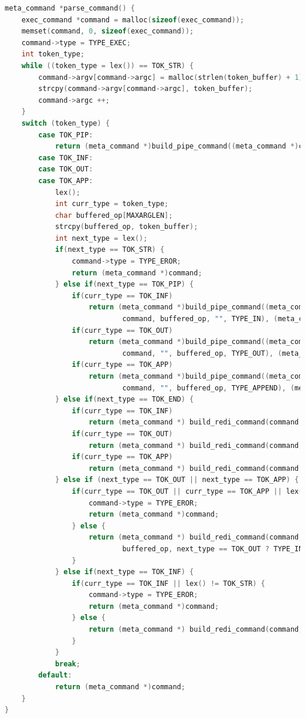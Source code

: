 \documentclass[blue,normal,cn]{elegantnote}
\begin{document}
\begin{lstlisting}[language=C]
meta_command *parse_command() {
    exec_command *command = malloc(sizeof(exec_command));
    memset(command, 0, sizeof(exec_command));
    command->type = TYPE_EXEC;
    int token_type;
    while ((token_type = lex()) == TOK_STR) {
        command->argv[command->argc] = malloc(strlen(token_buffer) + 1);
        strcpy(command->argv[command->argc], token_buffer);
        command->argc ++;
    }
    switch (token_type) {
        case TOK_PIP:
            return (meta_command *)build_pipe_command((meta_command *)command,  (meta_command *)parse_command());
        case TOK_INF:
        case TOK_OUT:
        case TOK_APP:
            lex();
            int curr_type = token_type;
            char buffered_op[MAXARGLEN];
            strcpy(buffered_op, token_buffer);
            int next_type = lex();
            if(next_type == TOK_STR) {
                command->type = TYPE_EROR;
                return (meta_command *)command;
            } else if(next_type == TOK_PIP) {
                if(curr_type == TOK_INF)
                    return (meta_command *)build_pipe_command((meta_command *) build_redi_command(
                            command, buffered_op, "", TYPE_IN), (meta_command *)parse_command());
                if(curr_type == TOK_OUT)
                    return (meta_command *)build_pipe_command((meta_command *) build_redi_command(
                            command, "", buffered_op, TYPE_OUT), (meta_command *)parse_command());
                if(curr_type == TOK_APP)
                    return (meta_command *)build_pipe_command((meta_command *) build_redi_command(
                            command, "", buffered_op, TYPE_APPEND), (meta_command *)parse_command());
            } else if(next_type == TOK_END) {
                if(curr_type == TOK_INF)
                    return (meta_command *) build_redi_command(command, buffered_op, "", TYPE_IN);
                if(curr_type == TOK_OUT)
                    return (meta_command *) build_redi_command(command, "", buffered_op, TYPE_OUT);
                if(curr_type == TOK_APP)
                    return (meta_command *) build_redi_command(command, "", buffered_op, TYPE_APPEND);
            } else if (next_type == TOK_OUT || next_type == TOK_APP) {
                if(curr_type == TOK_OUT || curr_type == TOK_APP || lex() != TOK_STR) {
                    command->type = TYPE_EROR;
                    return (meta_command *)command;
                } else {
                    return (meta_command *) build_redi_command(command, token_buffer,
                            buffered_op, next_type == TOK_OUT ? TYPE_INOUT : TYPE_INAPPEND);
                }
            } else if(next_type == TOK_INF) {
                if(curr_type == TOK_INF || lex() != TOK_STR) {
                    command->type = TYPE_EROR;
                    return (meta_command *)command;
                } else {
                    return (meta_command *) build_redi_command(command, buffered_op, token_buffer, curr_type == TOK_OUT ? TYPE_INOUT : TYPE_INAPPEND);
                }
            }
            break;
        default:
            return (meta_command *)command;
    }
}


\end{lstlisting}
\end{document}
